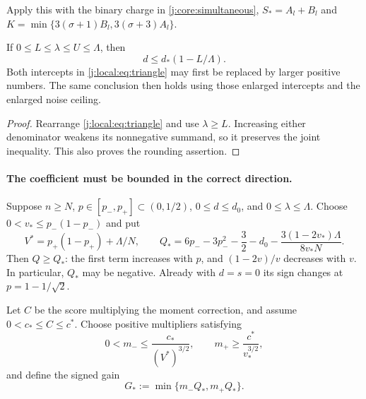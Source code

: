 Apply this with the binary charge in \eqref{j:core:simultaneous},
$S_*=A_l+B_l$ and $K=\min\{3(\sigma+1)B_l,3(\sigma+3)A_l\}$.
\begin{corollary}
If $0\le L\le\lambda\le U\le\Lambda$, then
\[
                       d\le d_*(1-L/\Lambda).
\]
Both intercepts in \eqref{j:local:eq:triangle} may first be replaced by larger
positive numbers. The same conclusion then holds using those enlarged
intercepts and the enlarged noise ceiling.
\end{corollary}
\begin{proof}
Rearrange \eqref{j:local:eq:triangle} and use $\lambda\ge L$.
Increasing either denominator weakens its nonnegative summand, so it
preserves the joint inequality. This also proves the rounding assertion.
\end{proof}



\paragraph{The coefficient must be bounded in the correct direction.}
Suppose $n\ge N$, $p\in[p_-,p_+]\subset(0,1/2)$,
$0\le d\le d_0$, and $0\le\lambda\le\Lambda$.
Choose $0<v_*\le p_-(1-p_-)$ and put
\[
 V^*=p_+(1-p_+)+\Lambda/N,\qquad
 Q_*=6p_--3p_-^2-\frac32-d_0
                     -\frac{3(1-2v_*)\Lambda}{8v_*N}.
\]
Then $Q\ge Q_*$: the first term increases with $p$, and
$(1-2v)/v$ decreases with $v$. In particular, $Q_*$ may be negative.
Already with $d=s=0$ its sign changes at $p=1-1/\sqrt2$.

Let $C$ be the score multiplying the moment correction, and assume
$0<c_*\le C\le c^*$. Choose positive multipliers satisfying
\[
        0<m_-\le\frac{c_*}{(V^*)^{3/2}},\qquad
        m_+\ge\frac{c^*}{v_*^{3/2}},
\]
and define the signed gain
\begin{equation}\label{j:local:gain}
             G_*:=\min\{m_-Q_*,m_+Q_*\}.
\end{equation}

